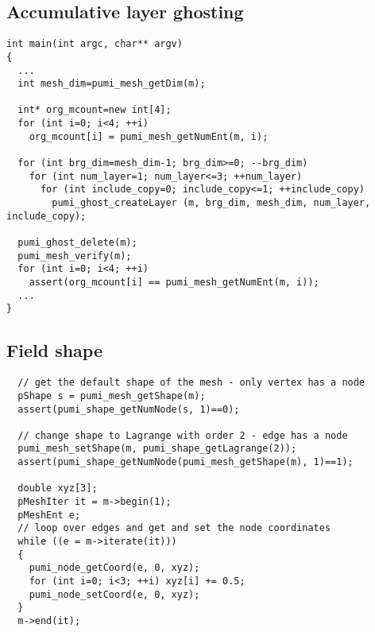 \subsection{ Accumulative layer ghosting}
\begin{small}
\begin{verbatim}
int main(int argc, char** argv)
{
  ...
  int mesh_dim=pumi_mesh_getDim(m);

  int* org_mcount=new int[4];
  for (int i=0; i<4; ++i)
    org_mcount[i] = pumi_mesh_getNumEnt(m, i);

  for (int brg_dim=mesh_dim-1; brg_dim>=0; --brg_dim)
    for (int num_layer=1; num_layer<=3; ++num_layer)
      for (int include_copy=0; include_copy<=1; ++include_copy)
        pumi_ghost_createLayer (m, brg_dim, mesh_dim, num_layer, include_copy);

  pumi_ghost_delete(m);
  pumi_mesh_verify(m);
  for (int i=0; i<4; ++i)
    assert(org_mcount[i] == pumi_mesh_getNumEnt(m, i));
  ...
}
\end{verbatim}
\end{small}

\subsection{ Field shape}
\begin{small}
\begin{verbatim}
  // get the default shape of the mesh - only vertex has a node
  pShape s = pumi_mesh_getShape(m);
  assert(pumi_shape_getNumNode(s, 1)==0);

  // change shape to Lagrange with order 2 - edge has a node
  pumi_mesh_setShape(m, pumi_shape_getLagrange(2));
  assert(pumi_shape_getNumNode(pumi_mesh_getShape(m), 1)==1);

  double xyz[3];
  pMeshIter it = m->begin(1);
  pMeshEnt e;
  // loop over edges and get and set the node coordinates
  while ((e = m->iterate(it)))
  {
    pumi_node_getCoord(e, 0, xyz);
    for (int i=0; i<3; ++i) xyz[i] += 0.5;
    pumi_node_setCoord(e, 0, xyz);
  }
  m->end(it);
\end{verbatim}
\end{small}

